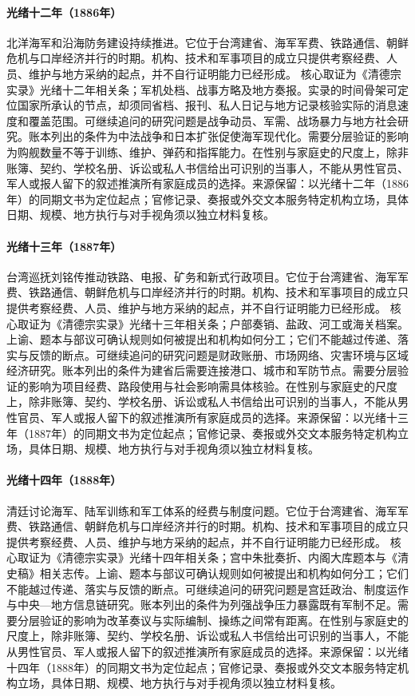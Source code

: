 \hypertarget{public:EQ-1886-BEIYANG-NAVY-EXPANSION}{}\paragraph{光绪十二年（1886年）}北洋海军和沿海防务建设持续推进。它位于台湾建省、海军军费、铁路通信、朝鲜危机与口岸经济并行的时期。机构、技术和军事项目的成立只提供考察经费、人员、维护与地方采纳的起点，并不自行证明能力已经形成。 核心取证为《清德宗实录》光绪十二年相关条；军机处档、战事方略及地方奏报。实录的时间骨架可定位国家所承认的节点，却须同省档、报刊、私人日记与地方记录核验实际的消息速度和覆盖范围。可继续追问的研究问题是战争动员、军需、战场暴力与地方社会研究。账本列出的条件为中法战争和日本扩张促使海军现代化。需要分层验证的影响为购舰数量不等于训练、维护、弹药和指挥能力。在性别与家庭史的尺度上，除非账簿、契约、学校名册、诉讼或私人书信给出可识别的当事人，不能从男性官员、军人或报人留下的叙述推演所有家庭成员的选择。来源保留：以光绪十二年（1886年）的同期文书为定位起点；官修记录、奏报或外交文本服务特定机构立场，具体日期、规模、地方执行与对手视角须以独立材料复核。
\hypertarget{public:EQ-1887-TAIWAN-RAILWAY-PLANNING}{}\paragraph{光绪十三年（1887年）}台湾巡抚刘铭传推动铁路、电报、矿务和新式行政项目。它位于台湾建省、海军军费、铁路通信、朝鲜危机与口岸经济并行的时期。机构、技术和军事项目的成立只提供考察经费、人员、维护与地方采纳的起点，并不自行证明能力已经形成。 核心取证为《清德宗实录》光绪十三年相关条；户部奏销、盐政、河工或海关档案。上谕、题本与部议可确认规则如何被提出和机构如何分工；它们不能越过传递、落实与反馈的断点。可继续追问的研究问题是财政账册、市场网络、灾害环境与区域经济研究。账本列出的条件为建省后需要连接港口、城市和军防节点。需要分层验证的影响为项目经费、路段使用与社会影响需具体核验。在性别与家庭史的尺度上，除非账簿、契约、学校名册、诉讼或私人书信给出可识别的当事人，不能从男性官员、军人或报人留下的叙述推演所有家庭成员的选择。来源保留：以光绪十三年（1887年）的同期文书为定位起点；官修记录、奏报或外交文本服务特定机构立场，具体日期、规模、地方执行与对手视角须以独立材料复核。
\hypertarget{public:EQ-1888-NAVAL-AND-ARMY-REFORM}{}\paragraph{光绪十四年（1888年）}清廷讨论海军、陆军训练和军工体系的经费与制度问题。它位于台湾建省、海军军费、铁路通信、朝鲜危机与口岸经济并行的时期。机构、技术和军事项目的成立只提供考察经费、人员、维护与地方采纳的起点，并不自行证明能力已经形成。 核心取证为《清德宗实录》光绪十四年相关条；宫中朱批奏折、内阁大库题本与《清史稿》相关志传。上谕、题本与部议可确认规则如何被提出和机构如何分工；它们不能越过传递、落实与反馈的断点。可继续追问的研究问题是宫廷政治、制度运作与中央—地方信息链研究。账本列出的条件为列强战争压力暴露既有军制不足。需要分层验证的影响为改革奏议与实际编制、操练之间常有距离。在性别与家庭史的尺度上，除非账簿、契约、学校名册、诉讼或私人书信给出可识别的当事人，不能从男性官员、军人或报人留下的叙述推演所有家庭成员的选择。来源保留：以光绪十四年（1888年）的同期文书为定位起点；官修记录、奏报或外交文本服务特定机构立场，具体日期、规模、地方执行与对手视角须以独立材料复核。
